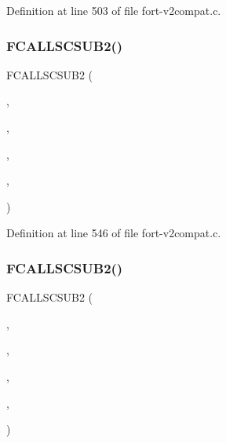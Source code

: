 Definition at line 503 of file fort-\/v2compat.\+c.

\mbox{\label{fort-v2compat_8c_abb8acf453dc1ee7705dcece3874a7125}} 
\subsubsection{\texorpdfstring{F\+C\+A\+L\+L\+S\+C\+S\+U\+B2()}{FCALLSCSUB2()}\hspace{0.1cm}{\footnotesize\ttfamily [4/5]}}
{\footnotesize\ttfamily F\+C\+A\+L\+L\+S\+C\+S\+U\+B2 (\begin{DoxyParamCaption}\item[{\hyperlink{nf__v2compat_8c_a63dd616a411f60543435c9b07db52bb5}{c\+\_\+ncsnc}}]{,  }\item[{N\+C\+S\+NC}]{,  }\item[{\hyperlink{nf__fortv2_8f90_a64e09d2a2a1ccf7e9052b111a169c2b9}{ncsnc}}]{,  }\item[{N\+C\+ID}]{,  }\item[{\hyperlink{fort-v2compat_8c_ae2352f39cbd25bcaf1bedbbb12db73fe}{P\+R\+C\+O\+DE}}]{ }\end{DoxyParamCaption})}



Definition at line 546 of file fort-\/v2compat.\+c.

\mbox{\label{fort-v2compat_8c_a5807dd6314185593914b654086682d73}} 
\subsubsection{\texorpdfstring{F\+C\+A\+L\+L\+S\+C\+S\+U\+B2()}{FCALLSCSUB2()}\hspace{0.1cm}{\footnotesize\ttfamily [5/5]}}
{\footnotesize\ttfamily F\+C\+A\+L\+L\+S\+C\+S\+U\+B2 (\begin{DoxyParamCaption}\item[{\hyperlink{nf__v2compat_8c_a59f52ed3a2ef5478df2530ae211501e8}{c\+\_\+ncabor}}]{,  }\item[{N\+C\+A\+B\+OR}]{,  }\item[{\hyperlink{nf__fortv2_8f90_a0e25c674ad6b99068e8c95d7f34f3c8e}{ncabor}}]{,  }\item[{N\+C\+ID}]{,  }\item[{\hyperlink{fort-v2compat_8c_ae2352f39cbd25bcaf1bedbbb12db73fe}{P\+R\+C\+O\+DE}}]{ }\end{DoxyParamCaption})}



